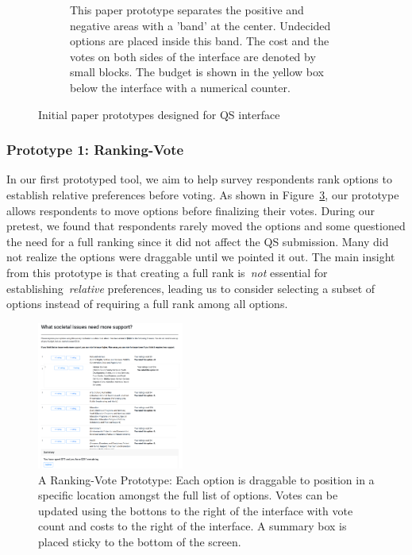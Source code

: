 \begin{figure}[H]
\begin{subfigure}[b]{0.42\textwidth}
        \caption{This paper prototype separates the positive and negative areas with a 'band' at the center. Undecided options are placed inside this band. The cost and the votes on both sides of the interface are denoted by small blocks. The budget is shown in the yellow box below the interface with a numerical counter.}
        \label{fig:vertical_paper}
    \end{subfigure}
    \caption{Initial paper prototypes designed for QS interface}
    \label{fig:qv_paper}
\end{figure}

\subsubsection{Prototype 1: Ranking-Vote}
In our first prototyped tool, we aim to help survey respondents rank options to establish relative preferences before voting. As shown in Figure~\ref{fig:qv_rank}, our prototype allows respondents to move options before finalizing their votes. During our pretest, we found that respondents rarely moved the options and some questioned the need for a full ranking since it did not affect the QS submission. Many did not realize the options were draggable until we pointed it out. The main insight from this prototype is that creating a full rank is~\textit{not} essential for establishing~\textit{relative} preferences, leading us to consider selecting a subset of options instead of requiring a full rank among all options.

\begin{figure}[h]
    \centering
    \includegraphics[width=0.43\textwidth]{content/image/prototypes/2_ranking.png}
    \caption{A Ranking-Vote Prototype: Each option is draggable to position in a specific location amongst the full list of options. Votes can be updated using the bottons to the right of the interface with vote count and costs to the right of the interface. A summary box is placed sticky to the bottom of the screen.}
    \label{fig:qv_rank}
\end{figure}


